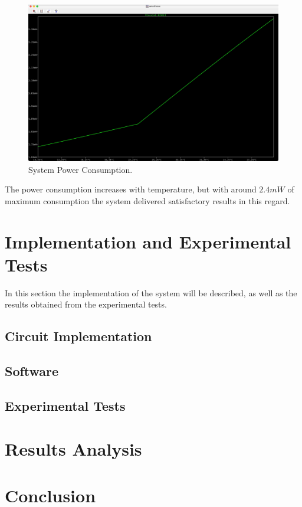 \documentclass[12pt]{article}
\begin{document}
    \begin{figure}[H] 
        \centering
        \includegraphics*[scale = 0.15]{images/PowerConsumption.jpeg}
        \caption{System Power Consumption.}
        \label{wrap-fig:1}
    \end{figure}

    The power consumption increases with temperature, but with around $2.4 mW$ of maximum consumption the system delivered satisfactory results in this regard.  
    
\section{Implementation and Experimental Tests}

In this section the implementation of the system will be described, as well as the results obtained from the experimental tests.

\subsection{Circuit Implementation}

\subsection{Software}

\subsection{Experimental Tests}

\section{Results Analysis}

\section{Conclusion}
\end{document}
